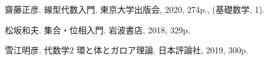 \documentclass[../../main]{subfiles}
\begin{document}
\begin{thebibliography}{99}
    齋藤正彦. 線型代数入門. 東京大学出版会, 2020, 274p., (基礎数学, 1).

    松坂和夫. 集合・位相入門. 岩波書店, 2018, 329p.

    雪江明彦. 代数学2 環と体とガロア理論. 日本評論社, 2019, 300p.
\end{thebibliography}
\end{document}
